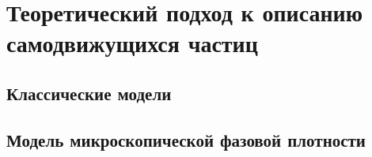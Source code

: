 \section{Теоретический подход к описанию самодвижущихся частиц} %
\label{sec:TheoreticalModels}
    \subsection{Классические модели} %
    \label{sub:ClassicalModelsWIthViscosity}
    

    \subsection{Модель микроскопической фазовой плотности} %
    \label{sub:KulinskyModel}
    
